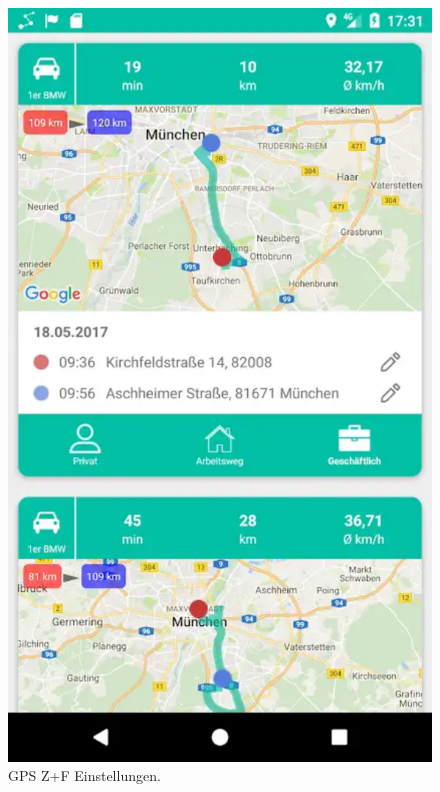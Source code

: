 \documentclass[a4paper]{article}
\begin{document}
\begin{figure}[H]%
    \begin{minipage}[b]{.4\linewidth} %
        \includegraphics[scale=0.14]{img/squ3}
        \caption{\label{img:img/squ3}GPS Z+F Einstellungen.}
    \end{minipage}
    \hspace{0.1\linewidth}%
    \begin{minipage}[b]{.4\linewidth} %

\end{minipage}
\end{figure}
\end{document}
